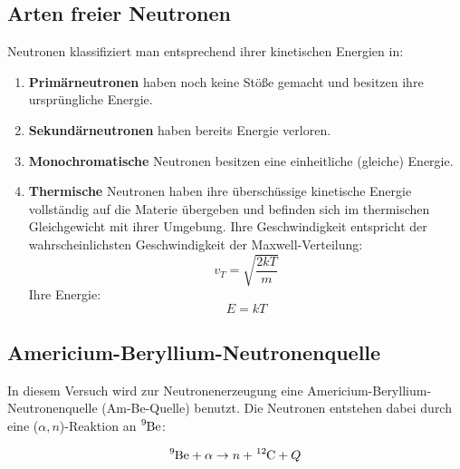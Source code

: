 \documentclass[a4paper,titlepage]{scrartcl}
\numberwithin{equation}{section}
\begin{document}
\subsection{Arten freier Neutronen}
Neutronen klassifiziert man entsprechend ihrer kinetischen Energien in:
\begin{enumerate}
\item \textbf{Primärneutronen} haben noch keine Stöße gemacht und besitzen ihre ursprüngliche Energie.
\item \textbf{Sekundärneutronen} haben bereits Energie verloren.
\item \textbf{Monochromatische} Neutronen besitzen eine einheitliche (gleiche) Energie.
\item \textbf{Thermische} Neutronen haben ihre überschüssige kinetische Energie vollständig auf die Materie übergeben und befinden sich im thermischen Gleichgewicht mit ihrer Umgebung. Ihre Geschwindigkeit entspricht der wahrscheinlichsten Geschwindigkeit der Maxwell-Verteilung:
\begin{equation}
v_T=\sqrt{\frac{2kT}{m}}
\end{equation}
Ihre Energie:
\begin{equation}
E=kT
\end{equation}
\end{enumerate}

\subsection{Americium-Beryllium-Neutronenquelle}
In diesem Versuch wird zur Neutronenerzeugung eine Americium-Beryllium-Neutronenquelle (Am-Be-Quelle) benutzt. Die Neutronen entstehen dabei durch eine ($\alpha, n$)-Reaktion an $\ce{^{9}Be}$:

\begin{equation}
\ce{^{9}Be} + \alpha \rightarrow n + \ce{^{12}C} + Q
\end{equation}
\end{document}
